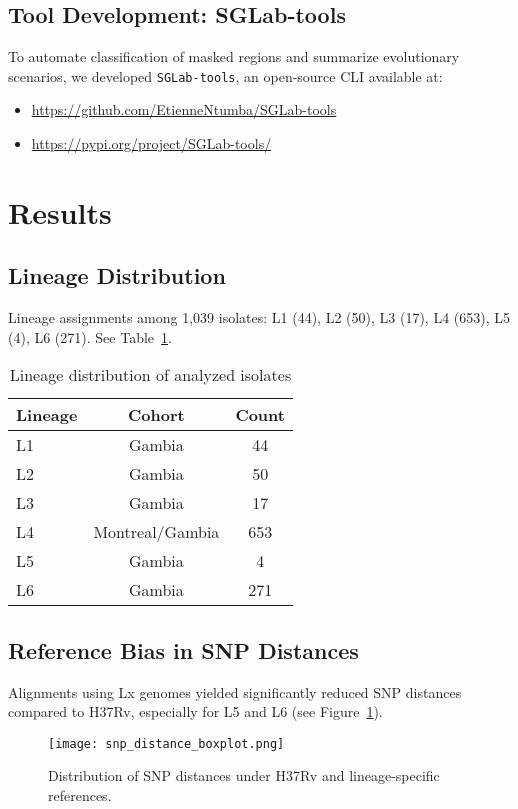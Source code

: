 \documentclass[12pt]{article}
\begin{document}
\subsection{Tool Development: SGLab-tools}
To automate classification of masked regions and summarize evolutionary scenarios, we developed \texttt{SGLab-tools}, an open-source CLI available at:
\begin{itemize}
    \item \url{https://github.com/EtienneNtumba/SGLab-tools}
    \item \url{https://pypi.org/project/SGLab-tools/}
\end{itemize}

\section{Results}
\subsection{Lineage Distribution}
Lineage assignments among 1,039 isolates: L1 (44), L2 (50), L3 (17), L4 (653), L5 (4), L6 (271). See Table~\ref{tab:lineages}.

\begin{table}[H]
\centering
\caption{Lineage distribution of analyzed isolates}
\begin{tabular}{@{}lcc@{}}
\toprule
Lineage & Cohort         & Count \\
\midrule
L1      & Gambia         & 44    \\
L2      & Gambia         & 50    \\
L3      & Gambia         & 17    \\
L4      & Montreal/Gambia & 653   \\
L5      & Gambia         & 4     \\
L6      & Gambia         & 271   \\
\bottomrule
\end{tabular}
\label{tab:lineages}
\end{table}

\subsection{Reference Bias in SNP Distances}
Alignments using Lx genomes yielded significantly reduced SNP distances compared to H37Rv, especially for L5 and L6 (see Figure~\ref{fig:snpdist}).

\begin{figure}[H]
    \centering
    \texttt{[image: snp\_distance\_boxplot.png]}
    \caption{Distribution of SNP distances under H37Rv and lineage-specific references.}
    \label{fig:snpdist}
\end{figure}
\end{document}
